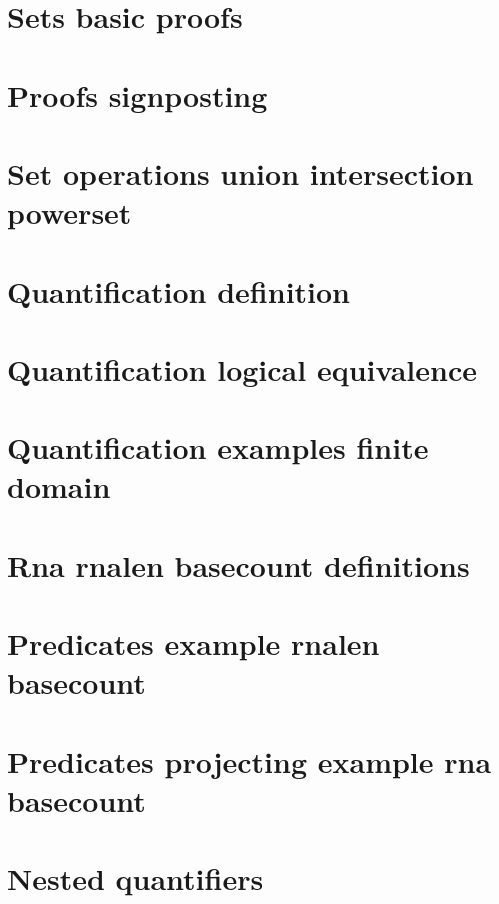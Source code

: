 \section*{Sets basic proofs}

\vfill
\section*{Proofs signposting}

\vfill
\section*{Set operations union intersection powerset}

\vfill
\section*{Quantification definition}

\vfill
\section*{Quantification logical equivalence}

\vfill
\section*{Quantification examples finite domain}

\vfill
\section*{Rna rnalen basecount definitions}

\vfill
\section*{Predicates example rnalen basecount}

\vfill
\section*{Predicates projecting example rna basecount}

\vfill
\section*{Nested quantifiers}

\vfill
